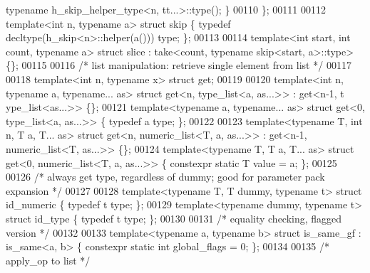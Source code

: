\begin{DoxyCode}
{      typename} h\_skip\_helper\_type<n, tt...>::type(); \}
00110 \};
00111 
00112 \textcolor{keyword}{template}<\textcolor{keywordtype}{int} n, \textcolor{keyword}{typename} a> \textcolor{keyword}{struct }skip \{ \textcolor{keyword}{typedef} decltype(h\_skip<n>::helper(a())) type; \};
00113 
00114 template<\textcolor{keywordtype}{int} start, \textcolor{keywordtype}{int} count, typename a> struct slice : take<count, typename skip<start, a>::type> \{\};
00115 
00116 \textcolor{comment}{/* list manipulation: retrieve single element from list */}
00117 
00118 \textcolor{keyword}{template}<\textcolor{keywordtype}{int} n, \textcolor{keyword}{typename} x> \textcolor{keyword}{struct }get;
00119 
00120 \textcolor{keyword}{template}<\textcolor{keywordtype}{int} n, \textcolor{keyword}{typename} a, \textcolor{keyword}{typename}... as>               \textcolor{keyword}{struct }get<n, type\_list<a, as...>>   : get<n-1, t
      ype\_list<as...>> \{\};
00121 \textcolor{keyword}{template}<\textcolor{keyword}{typename} a, \textcolor{keyword}{typename}... as>                      \textcolor{keyword}{struct }get<0, type\_list<a, as...>>   \{ \textcolor{keyword}{typedef} a 
      type; \};
00122 
00123 \textcolor{keyword}{template}<\textcolor{keyword}{typename} T, \textcolor{keywordtype}{int} n, T a, T... as>                        \textcolor{keyword}{struct }get<n, numeric\_list<T, a, as...>>  
       : get<n-1, numeric\_list<T, as...>> \{\};
00124 \textcolor{keyword}{template}<\textcolor{keyword}{typename} T, T a, T... as>                               \textcolor{keyword}{struct }get<0, numeric\_list<T, a, as...>>  
       \{ constexpr \textcolor{keyword}{static} T value = a; \};
00125 
00126 \textcolor{comment}{/* always get type, regardless of dummy; good for parameter pack expansion */}
00127 
00128 \textcolor{keyword}{template}<\textcolor{keyword}{typename} T, T dummy, \textcolor{keyword}{typename} t> \textcolor{keyword}{struct }id\_numeric  \{ \textcolor{keyword}{typedef} t type; \};
00129 \textcolor{keyword}{template}<\textcolor{keyword}{typename} dummy, \textcolor{keyword}{typename} t>      \textcolor{keyword}{struct }id\_type     \{ \textcolor{keyword}{typedef} t type; \};
00130 
00131 \textcolor{comment}{/* equality checking, flagged version */}
00132 
00133 \textcolor{keyword}{template}<\textcolor{keyword}{typename} a, \textcolor{keyword}{typename} b> \textcolor{keyword}{struct }is\_same\_gf : is\_same<a, b> \{ constexpr \textcolor{keyword}{static} \textcolor{keywordtype}{int} global\_flags = 0;
       \};
00134 
00135 \textcolor{comment}{/* apply\_op to list */}

\end{DoxyCode}
